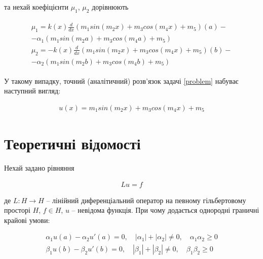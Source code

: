 та нехай коефіцієнти $\mu_1$, $\mu_2$ дорівнюють

\begin{align}
\begin{split}
\mu_1 = k(x)\frac{d}{dx}\left(m_1 sin(m_2 x) + m_3 cos(m_4 x) + m_5 \right)(a) - \\ - \alpha_1 \left(m_1 sin(m_2 a) + m_3 cos(m_4 a) + m_5 \right) \\
\mu_2 = - k(x)\frac{d}{dx}\left(m_1 sin(m_2 x) + m_3 cos(m_4 x) + m_5 \right)(b) - \\ - \alpha_2 \left(m_1 sin(m_2 b) + m_3 cos(m_4 b) + m_5 \right)
\end{split}
\end{align}

У такому випадку, точний (аналітичний) розв'язок задачі \ref{problem} набуває наступний вигляд:

\begin{equation} \label{analytical_solution}  
\begin{split}
u(x) = m_1 sin(m_2 x) + m_3 cos(m_4 x) + m_5
\end{split}					
\end{equation}




\section{Теоретичні відомості}

Нехай задано рівняння

\begin{equation}  \label{uravnenie}
\begin{split}
Lu = f
\end{split}					
\end{equation}

де $L: H \rightarrow H$ -- лінійний диференціальний оператор на певному гільбертовому просторі $H$, $f \in H$, $u$ -- невідома функція.
При чому додається однородні граничні крайові умови:

\begin{equation} \label{kraevaya_zad}
\begin{split}
\alpha_1 u(a) - \alpha_2 u'(a) = 0, \quad |\alpha_1| + |\alpha_2| \neq 0, \quad \alpha_1 \alpha_2 \geq 0 \\
\beta_1 u(b) - \beta_2 u'(b) = 0, \quad |\beta_1| + |\beta_2| \neq 0, \quad \beta_1 \beta_2 \geq 0 \\
\end{split}					
\end{equation}


